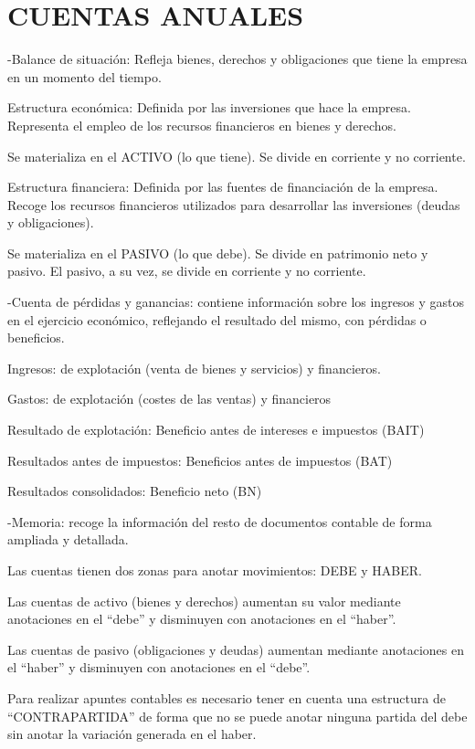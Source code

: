 \documentclass[12pt, twoside, openright]{report} %
\begin{document}
\section{CUENTAS ANUALES}
-Balance de situación: Refleja bienes, derechos y obligaciones que tiene la empresa en un momento del
tiempo.

Estructura económica: Definida por las inversiones que hace la empresa. Representa el empleo de los
recursos financieros en bienes y derechos.

Se materializa en el ACTIVO (lo que tiene). Se divide en corriente y no corriente.

Estructura financiera: Definida por las fuentes de financiación de la empresa. Recoge los recursos financieros
utilizados para desarrollar las inversiones (deudas y obligaciones).

Se materializa en el PASIVO (lo que debe). Se divide en patrimonio neto y pasivo. El pasivo, a su vez, se divide
en corriente y no corriente.

-Cuenta de pérdidas y ganancias: contiene información sobre los ingresos y gastos en el ejercicio económico,
reflejando el resultado del mismo, con pérdidas o beneficios.

Ingresos: de explotación (venta de bienes y servicios) y financieros.

Gastos: de explotación (costes de las ventas) y financieros

Resultado de explotación: Beneficio antes de intereses e impuestos (BAIT)

Resultados antes de impuestos: Beneficios antes de impuestos (BAT)

Resultados consolidados: Beneficio neto (BN)

-Memoria: recoge la información del resto de documentos contable de forma ampliada y detallada.

Las cuentas tienen dos zonas para anotar movimientos: DEBE y HABER.

Las cuentas de activo (bienes y derechos) aumentan su valor mediante anotaciones en el “debe” y
disminuyen con anotaciones en el “haber”.

Las cuentas de pasivo (obligaciones y deudas) aumentan mediante anotaciones en el “haber” y disminuyen
con anotaciones en el “debe”.

Para realizar apuntes contables es necesario tener en cuenta una estructura de “CONTRAPARTIDA” de forma
que no se puede anotar ninguna partida del debe sin anotar la variación generada en el haber.
\end{document}
